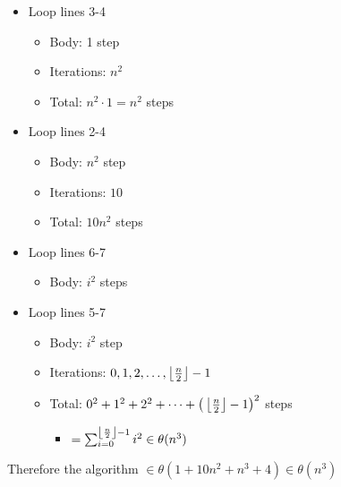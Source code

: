 \documentclass[12pt, letterpaper, twoside]{article}
\begin{document}
    \begin{itemize}
        \item Loop lines 3-4
        \begin{itemize}
            \item Body: 1 step
            \item Iterations: $n^2$
            \item Total: $n^2 \cdot 1 = n^2$ steps
        \end{itemize}
    \end{itemize}
    \begin{itemize}
        \item Loop lines 2-4
        \begin{itemize}
            \item Body: $n^2$ step
            \item Iterations: $10$
            \item Total: $10n^2$ steps
        \end{itemize}
    \end{itemize}
    \begin{itemize}
        \item Loop lines 6-7
        \begin{itemize}
            \item Body: $i^2$ steps
        \end{itemize}
    \end{itemize}
    \begin{itemize}
        \item Loop lines 5-7
        \begin{itemize}
            \item Body: $i^2$ step
            \item Iterations: $0, 1, 2, \dots, \left \lfloor \frac{n}{2} \right \rfloor - 1$
            \item Total: $0^2 + 1^2 + 2^2 + \dots + \big(\left \lfloor \frac{n}{2} \right \rfloor - 1\big)^2$ steps
            \begin{itemize}
                \item $= \sum_{i = 0}^{\left \lfloor \frac{n}{2} \right \rfloor - 1} i^2 \in \theta(n^3)$
            \end{itemize}
        \end{itemize}
    \end{itemize}
    Therefore the algorithm $\in \theta(1 + 10n^2 + n^3 + 4) \in \theta(n^3)$
\end{document}
